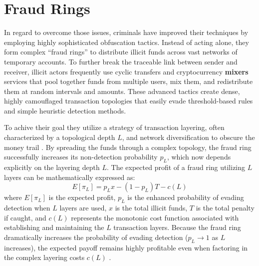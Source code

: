 \section{Fraud Rings}
In regard to overcome those issues, criminals have improved their techniques by employing highly sophisticated obfuscation tactics. Instead of acting alone, they form complex ``fraud rings'' to distribute illicit funds across vast networks of temporary accounts. To further break the traceable link between sender and receiver, illicit actors frequently use cyclic transfers and cryptocurrency \textbf{mixers} services that pool together funds from multiple users, mix them, and redistribute them at random intervals and amounts. These advanced tactics create dense, highly camouflaged transaction topologies that easily evade threshold-based rules and simple heuristic detection methods.

To achive their goal they utilize a strategy of transaction layering, often characterized by a topological depth $L$, and network diversification to obscure the money trail \cite{contreras2026strategic, li2025scamsweeper}.
By spreading the funds through a complex topology, the fraud ring successfully increases its non-detection probability $p_L$, which now depends explicitly on the layering depth $L$. The expected profit of a fraud ring utilizing $L$ layers can be mathematically expressed as:
\begin{equation}
    E[\pi_L] = p_L x - (1-p_L)T - c(L)
\end{equation}
where $E[\pi_L]$ is the expected profit, $p_L$ is the enhanced probability of evading detection when $L$ layers are used, $x$ is the total illicit funds, $T$ is the total penalty if caught, and $c(L)$ represents the monotonic cost function associated with establishing and maintaining the $L$ transaction layers. Because the fraud ring dramatically increases the probability of evading detection ($p_L \to 1$ as $L$ increases), the expected payoff remains highly profitable even when factoring in the complex layering costs $c(L)$ \cite{contreras2026strategic}. 

